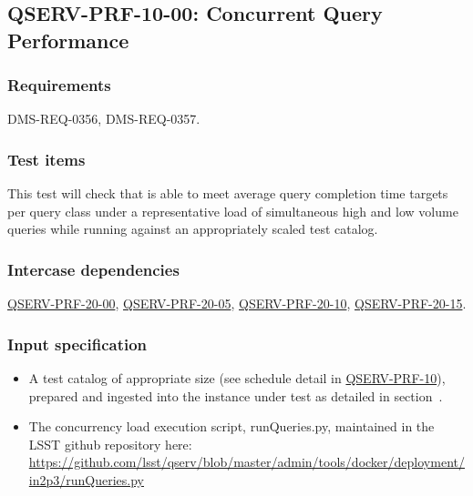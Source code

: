 \subsection{\textsc{QSERV-PRF-10-00}: Concurrent Query Performance}
\label{qserv-prf-10-00}

\subsubsection{Requirements \label{sect:reqs}}

DMS-REQ-0356, DMS-REQ-0357.

\subsubsection{Test items}

This test will check that \product{} is able to meet average query completion time targets per query class
under a representative load of simultaneous high and low volume queries while running against an appropriately
scaled test catalog.

\subsubsection{Intercase dependencies}

\hyperref[qserv-prf-20-00]{\textsc{QSERV-PRF-20-00}},
\hyperref[qserv-prf-20-05]{\textsc{QSERV-PRF-20-05}},
\hyperref[qserv-prf-20-10]{\textsc{QSERV-PRF-20-10}},
\hyperref[qserv-prf-20-15]{\textsc{QSERV-PRF-20-15}}.

\subsubsection{Input specification}

\begin{itemize}

  \item{A test catalog of appropriate size (see schedule detail in \hyperref[qserv-prf-10]{\textsc{
  QSERV-PRF-10}}), prepared and ingested into the \product{} instance under test as detailed in
  section~.}

  \item{The concurrency load execution script, runQueries.py, maintained in the LSST \product{}
  github repository here: \url{https://github.com/lsst/qserv/blob/master/admin/tools/docker/deployment/in2p3/runQueries.py}}

\end{itemize}

